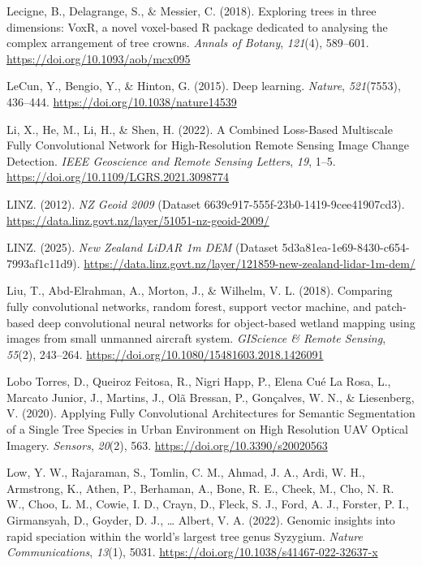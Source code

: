 \documentclass[
]{scrreprt}
\newlength{\cslhangindent}
\newenvironment{CSLReferences}[2] %
 {\begin{list}{}{%
  \setlength{\itemindent}{0pt}
  \setlength{\leftmargin}{0pt}
  \setlength{\parsep}{0pt}
  \setlength{\baselineskip}{12pt}
  \ifodd #1
   \setlength{\leftmargin}{\cslhangindent}
   \setlength{\itemindent}{-1\cslhangindent}
  \fi
  \setlength{\itemsep}{4pt}}}
 {\end{list}}
\begin{document}
\begin{CSLReferences}{1}{0}
Lecigne, B., Delagrange, S., \& Messier, C. (2018). Exploring trees in
three dimensions: {VoxR}, a novel voxel-based {R} package dedicated to
analysing the complex arrangement of tree crowns. \emph{Annals of
Botany}, \emph{121}(4), 589--601.
\url{https://doi.org/10.1093/aob/mcx095}

LeCun, Y., Bengio, Y., \& Hinton, G. (2015). Deep learning.
\emph{Nature}, \emph{521}(7553), 436--444.
\url{https://doi.org/10.1038/nature14539}

Li, X., He, M., Li, H., \& Shen, H. (2022). A {Combined Loss-Based
Multiscale Fully Convolutional Network} for {High-Resolution Remote
Sensing Image Change Detection}. \emph{IEEE Geoscience and Remote
Sensing Letters}, \emph{19}, 1--5.
\url{https://doi.org/10.1109/LGRS.2021.3098774}

LINZ. (2012). \emph{{NZ Geoid} 2009} (Dataset
6639c917-555f-23b0-1419-9cee41907cd3).
\url{https://data.linz.govt.nz/layer/51051-nz-geoid-2009/}

LINZ. (2025). \emph{New {Zealand LiDAR} 1m {DEM}} (Dataset
5d3a81ea-1e69-8430-c654-7993af1c11d9).
\url{https://data.linz.govt.nz/layer/121859-new-zealand-lidar-1m-dem/}

Liu, T., Abd-Elrahman, A., Morton, J., \& Wilhelm, V. L. (2018).
Comparing fully convolutional networks, random forest, support vector
machine, and patch-based deep convolutional neural networks for
object-based wetland mapping using images from small unmanned aircraft
system. \emph{GIScience \& Remote Sensing}, \emph{55}(2), 243--264.
\url{https://doi.org/10.1080/15481603.2018.1426091}

Lobo Torres, D., Queiroz Feitosa, R., Nigri Happ, P., Elena Cué La Rosa,
L., Marcato Junior, J., Martins, J., Olã Bressan, P., Gonçalves, W. N.,
\& Liesenberg, V. (2020). Applying {Fully Convolutional Architectures}
for {Semantic Segmentation} of a {Single Tree Species} in {Urban
Environment} on {High Resolution UAV Optical Imagery}. \emph{Sensors},
\emph{20}(2), 563. \url{https://doi.org/10.3390/s20020563}

Low, Y. W., Rajaraman, S., Tomlin, C. M., Ahmad, J. A., Ardi, W. H.,
Armstrong, K., Athen, P., Berhaman, A., Bone, R. E., Cheek, M., Cho, N.
R. W., Choo, L. M., Cowie, I. D., Crayn, D., Fleck, S. J., Ford, A. J.,
Forster, P. I., Girmansyah, D., Goyder, D. J., \ldots{} Albert, V. A.
(2022). Genomic insights into rapid speciation within the world's
largest tree genus {Syzygium}. \emph{Nature Communications},
\emph{13}(1), 5031. \url{https://doi.org/10.1038/s41467-022-32637-x}


\end{CSLReferences}
\end{document}
